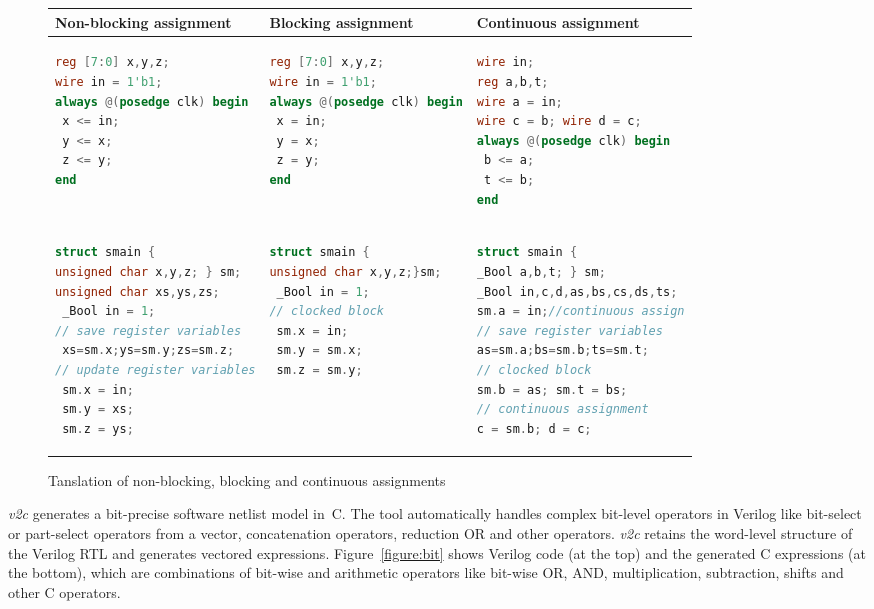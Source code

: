 \begin{figure*}
\scriptsize
\center
\begin{tabular}{l|l|l}
\hline
Non-blocking assignment & Blocking assignment & Continuous assignment \\
\hline
\begin{lstlisting}[mathescape=true,language=Verilog]
reg [7:0] x,y,z;
wire in = 1'b1;
always @(posedge clk) begin
 x <= in;
 y <= x;
 z <= y;
end
\end{lstlisting}
&
\begin{lstlisting}[mathescape=true,language=Verilog]
reg [7:0] x,y,z;
wire in = 1'b1;
always @(posedge clk) begin
 x = in;
 y = x;
 z = y;
end
\end{lstlisting}
&
\begin{lstlisting}[mathescape=true,language=Verilog]
wire in;
reg a,b,t;
wire a = in;
wire c = b; wire d = c; 
always @(posedge clk) begin
 b <= a;
 t <= b;
end 
\end{lstlisting}
\\
\hline 
\begin{lstlisting}[mathescape=true,language=C]
struct smain { 
unsigned char x,y,z; } sm;
unsigned char xs,ys,zs;
 _Bool in = 1;
// save register variables
 xs=sm.x;ys=sm.y;zs=sm.z;
// update register variables
 sm.x = in;
 sm.y = xs;
 sm.z = ys;
\end{lstlisting}
&
\begin{lstlisting}[mathescape=true,language=C]
struct smain {
unsigned char x,y,z;}sm;
 _Bool in = 1;
// clocked block
 sm.x = in;
 sm.y = sm.x;
 sm.z = sm.y;
\end{lstlisting}
&
\begin{lstlisting}[mathescape=true,language=C]
struct smain {
_Bool a,b,t; } sm;
_Bool in,c,d,as,bs,cs,ds,ts;
sm.a = in;//continuous assign
// save register variables
as=sm.a;bs=sm.b;ts=sm.t;
// clocked block
sm.b = as; sm.t = bs;
// continuous assignment 
c = sm.b; d = c;
\end{lstlisting}
\\
\hline
\end{tabular}
\caption{Tanslation of non-blocking, blocking and continuous assignments}
\label{figure:block}
\end{figure*}

\emph{v2c} generates a bit-precise software netlist model in~C.  The tool
automatically handles complex bit-level operators in Verilog like
bit-select or part-select operators from a vector, concatenation operators,
reduction OR and other operators.  \emph{v2c} retains the word-level structure 
of the Verilog RTL and generates vectored expressions. 
Figure~\ref{figure:bit} shows Verilog code (at the top) and the generated C
expressions (at the bottom), which are combinations of bit-wise and
arithmetic operators like bit-wise OR, AND, multiplication, subtraction,
shifts and other C operators.


